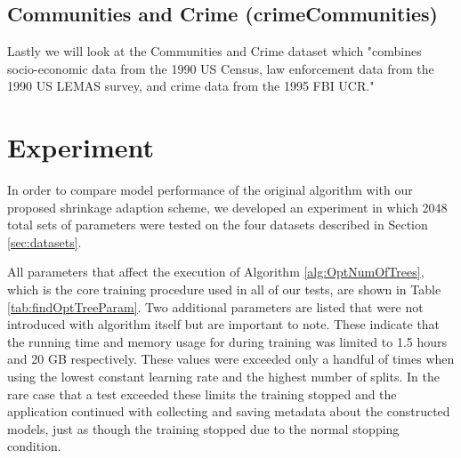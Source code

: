 \documentclass[9pt, conference]{IEEEtran}
\begin{document}
\subsection{Communities and Crime (crimeCommunities)}
Lastly we will look at the Communities and Crime dataset which "combines socio-economic data from the 1990 US Census, law enforcement data from the 1990 US LEMAS survey, and crime 
data from the 1995 FBI UCR." \cite{crimeCommunities} 

\section {Experiment}
In order to compare model performance of the original algorithm with our proposed shrinkage adaption scheme, we developed an experiment in which 2048 total sets of parameters were tested on the four datasets described in Section \ref{sec:datasets}. 

All parameters that affect the execution of Algorithm \ref{alg:OptNumOfTrees}, which is the core training procedure used in all of our tests, are shown in Table \ref{tab:findOptTreeParam}. Two additional parameters are listed that were not introduced with algorithm itself but are important to note. These indicate that the running time and memory usage for during training was limited to 1.5 hours and 20 GB respectively. These values were exceeded only a handful of times when using the lowest constant learning rate and the highest number of splits. In the rare case that a test exceeded these limits the training stopped and the application continued with collecting and saving metadata about the constructed models, just as though the training stopped due to the normal stopping condition.
\end{document}

